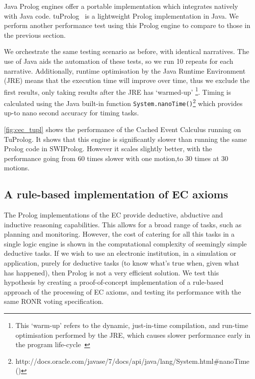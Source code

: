 Java Prolog engines offer a portable implementation which integrates natively
with Java code. tuProlog~\citep{Denti2005} is a lightweight Prolog
implementation in Java. We perform another performance test using this Prolog
engine to compare to those in the previous section.

We orchestrate the same testing scenario as before, with
identical narratives. The use of Java aids the automation of these tests, so
we run 10 repeats for each narrative. Additionally, runtime optimisation by
the Java Runtime Environment (JRE) means that the execution time will improve over
time, thus we exclude the first results, only taking results after the JRE has
`warmed-up'
\footnote{This `warm-up' refers to the dynamic, just-in-time compilation, and run-time optimisation performed by the JRE, which causes slower performance early in the program life-cycle~\citep{Blackburn2008}}. 
Timing is calculated using the Java built-in function
\texttt{System.nanoTime()}\footnote{http://docs.oracle.com/javase/7/docs/api/java/lang/System.html\#nanoTime()} 
which provides up-to nano second accuracy for timing tasks.

\autoref{fig:cec_tupl} shows the performance of the Cached Event Calculus running on
TuProlog. It shows that this engine is significantly slower than running the
same Prolog code in SWIProlog. However it scales slightly better, with the
performance going from 60 times slower with one motion,to 30 times at 30
motions.


\subsection{A rule-based implementation of EC axioms}

The Prolog implementations of the \ac{EC} provide deductive, abductive and
inductive reasoning capabilities. This allows for a broad range of tasks, such
as planning and monitoring. However, the cost of catering for all this tasks
in a single logic engine is shown in the computational complexity of seemingly
simple deductive tasks. If we wish to use an electronic institution, in a
simulation or application, purely for deductive tasks (to know what's true
when, given what has happened), then Prolog is not a very efficient solution.
We test this hypothesis by creating a proof-of-concept implementation of a
rule-based approach of the processing of \ac{EC} axioms, and testing its
performance with the same \ac{RONR} voting specification.

